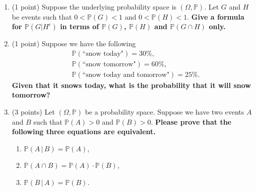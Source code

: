 \documentclass[11pt]{article}
\newcommand{\p}{\mathbb{P}}
\begin{document}
\begin{enumerate}
\begin{proof}
  By the law of total probability,
  \begin{align*}
    \p(A) &= \sum_{i=1}^{4} \p(A\,|\,B_i)\cdot \p(B_i)\\
    &= \sum_{i=1}^{4} \p(A\cap B_i)\\
    &= \p(W, W) + \p(B, B) + \p(\emptyset) + \p(\emptyset)\\
    &= \frac{w}{w+b}\cdot\frac{w+d}{w+b+d}+\frac{b}{w+b}\cdot\frac{w}{w+b+d}\\
    &= \frac{w^2+dw+bw}{(w+b)(w+b+d)}\\
    &= \frac{w(w+b+d)}{(w+b)(w+b+d)}\\
    &= \frac{w}{w+b}
  \end{align*}
  Therefore, we have proven that \(\p(A)\) does not depend on \(d\).
\end{proof}

\item (1 point) Suppose the underlying probability space is $(\Omega,\mathbb{P})$. Let $G$ and $H$ be events such that $0<\mathbb{P}(G)<1$ and $0<\mathbb{P}(H)<1$. \textbf{Give a formula for $\mathbb{P}(G|H^c)$ in terms of $\mathbb{P}(G)$, $\mathbb{P}(H)$ and $\mathbb{P}(G\cap H)$ only.}


\item (1 point) Suppose we have the following
\begin{align*}
    & \mathbb{P}(\text{``snow today"})=30\%, \\
    & \mathbb{P}(\text{``snow tomorrow"})=60\%, \\
    & \mathbb{P}(\text{``snow today and tomorrow"})=25\%.
\end{align*}
\textbf{Given that it snows today, what is the probability that it will snow tomorrow?}


\item (3 points) Let $(\Omega,\mathbb{P})$ be a probability space. Suppose we have two events $A$ and $B$ such that $\mathbb{P}(A)>0$ and $\mathbb{P}(B)>0$. \textbf{Please prove that the following three equations are equivalent.}
    \begin{enumerate}
        \item $\mathbb{P}(A\,\vert\,B)=\mathbb{P}(A)$,
        \item $\mathbb{P}(A\cap B)=\mathbb{P}(A)\cdot \mathbb{P}(B)$,
        \item $\mathbb{P}(B\,\vert\,A)=\mathbb{P}(B)$.
    \end{enumerate}

\end{enumerate}
\end{document}
